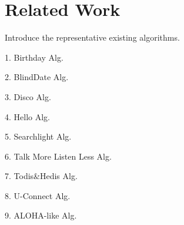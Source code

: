 \section{Related Work}

Introduce the representative existing algorithms.

1. Birthday Alg.

2. BlindDate Alg.

3. Disco Alg.

4. Hello Alg.

5. Searchlight Alg.

6. Talk More Listen Less Alg.

7. Todis\&Hedis Alg.

8. U-Connect Alg.

9.  ALOHA-like Alg.
